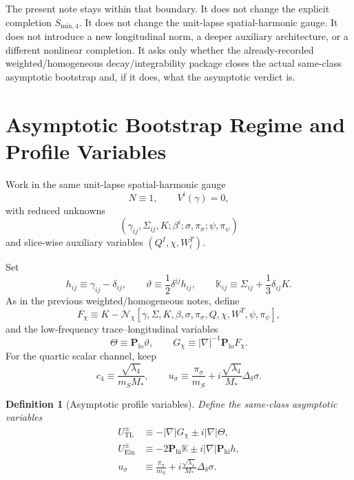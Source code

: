 \documentclass[11pt]{article}
\newtheorem{definition}{Definition}
\begin{document}
The present note stays within that boundary. It does not change the explicit completion \(S_{\mathrm{min},4}\). It does not change the unit-lapse spatial-harmonic gauge. It does not introduce a new longitudinal norm, a deeper auxiliary architecture, or a different nonlinear completion. It asks only whether the already-recorded weighted/homogeneous decay/integrability package closes the actual same-class asymptotic bootstrap and, if it does, what the asymptotic verdict is.

\section{Asymptotic Bootstrap Regime and Profile Variables}

Work in the same unit-lapse spatial-harmonic gauge
\begin{equation}
N\equiv 1,
\qquad
V^i(\gamma)=0,
\label{eq:gauge}
\end{equation}
with reduced unknowns
\begin{equation}
(\gamma_{ij},\Sigma_{ij},K;\beta^i;\sigma,\pi_\sigma;\psi,\pi_\psi)
\label{eq:unknowns}
\end{equation}
and slice-wise auxiliary variables \((Q^I,\chi,W_i^T)\).

Set
\begin{equation}
h_{ij}\equiv \gamma_{ij}-\delta_{ij},
\qquad
\vartheta \equiv \frac12\delta^{ij}h_{ij},
\qquad
\mathbb K_{ij}\equiv \Sigma_{ij}+\frac13\delta_{ij}K.
\label{eq:hkdefs}
\end{equation}
As in the previous weighted/homogeneous notes, define
\begin{equation}
F_\chi
\equiv
K-\mathcal N_\chi[\gamma,\Sigma,K,\beta,\sigma,\pi_\sigma,Q,\chi,W^T,\psi,\pi_\psi],
\label{eq:Fchi}
\end{equation}
and the low-frequency trace--longitudinal variables
\begin{equation}
\Theta \equiv \mathbf P_{\mathrm{lo}}\vartheta,
\qquad
G_\chi \equiv |\nabla|^{-1}\mathbf P_{\mathrm{lo}}F_\chi.
\label{eq:ThetaG}
\end{equation}
For the quartic scalar channel, keep
\begin{equation}
c_4 \equiv \frac{\sqrt{\lambda_4}}{m_SM_*},
\qquad
u_\sigma
\equiv
\frac{\pi_\sigma}{m_S}
+ i\frac{\sqrt{\lambda_4}}{M_*}\Delta_\delta\sigma.
\label{eq:usigma}
\end{equation}

\begin{definition}[Asymptotic profile variables]
\label{def:profiles}
Define the same-class asymptotic variables
\begin{align}
U_{\mathrm{TL}}^\pm
&\equiv
-|\nabla|G_\chi \pm i|\nabla|\Theta,
\label{eq:UTL}
\\
U_{\mathrm{Ein}}^\pm
&\equiv
-2\mathbf P_{\mathrm{hi}}\mathbb K
\pm i|\nabla|\mathbf P_{\mathrm{hi}}h,
\label{eq:UEin}
\\
u_\sigma
&\equiv
\frac{\pi_\sigma}{m_S}
+ i\frac{\sqrt{\lambda_4}}{M_*}\Delta_\delta\sigma.
\label{eq:Usigma2}
\end{align}
\end{definition}
\end{document}
